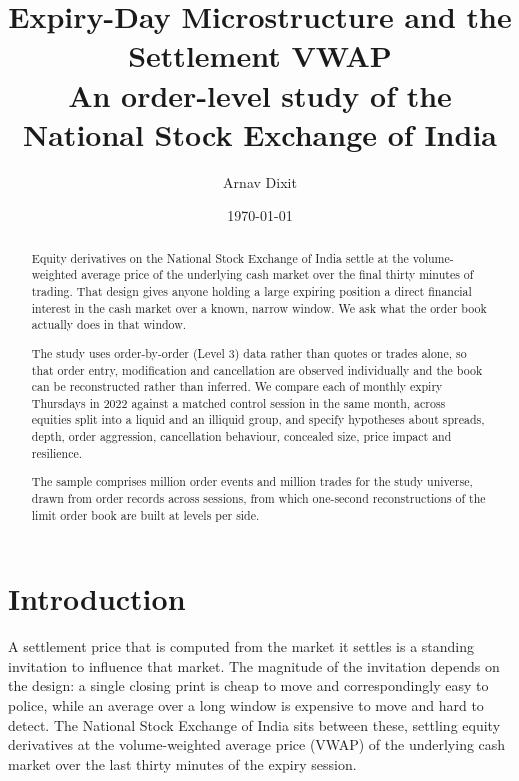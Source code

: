 \documentclass[11pt,a4paper]{article}
\title{\textbf{\color{deepnavy} Expiry-Day Microstructure and the Settlement VWAP\\
\large An order-level study of the National Stock Exchange of India}}
\author{Arnav Dixit}
\date{\today}
\begin{document}
\maketitle

\begin{abstract}
\noindent
Equity derivatives on the National Stock Exchange of India settle at the volume-weighted
average price of the underlying cash market over the final thirty minutes of trading. That
design gives anyone holding a large expiring position a direct financial interest in the
cash market over a known, narrow window. We ask what the order book actually does in that
window.

The study uses order-by-order (Level 3) data rather than quotes or trades alone, so that
order entry, modification and cancellation are observed individually and the book can be
reconstructed rather than inferred. We compare each of \DesignExpirySessions{} monthly
expiry Thursdays in 2022 against a matched control session in the same month, across
\DesignSymbols{} equities split into a liquid and an illiquid group, and specify
\TestSpecified{} hypotheses about spreads, depth, order aggression, cancellation behaviour,
concealed size, price impact and resilience.

The sample comprises \SampleOrderEventsMillions{} million order events and
\SampleTradesMillions{} million trades for the study universe, drawn from
\SampleOrderEventsRead{} order records across \SampleSessionsParsed{} sessions, from which
\SampleSnapshots{} one-second reconstructions of the limit order book are built at
\DesignBookLevels{} levels per side.

\ResultsHeadline{}
\end{abstract}


\section{Introduction}

A settlement price that is computed from the market it settles is a standing invitation to
influence that market. The magnitude of the invitation depends on the design: a single
closing print is cheap to move and correspondingly easy to police, while an average over a
long window is expensive to move and hard to detect. The National Stock Exchange of India
sits between these, settling equity derivatives at the volume-weighted average price (VWAP)
of the underlying cash market over the last thirty minutes of the expiry session.
\end{document}
